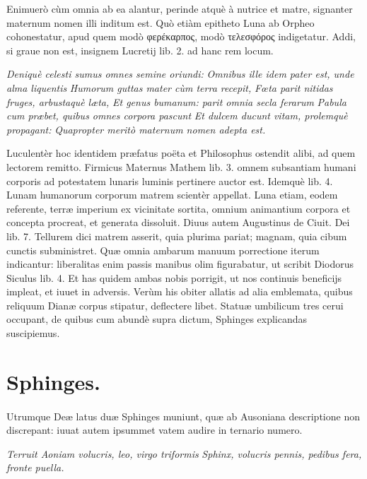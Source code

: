 \documentclass[a4paper, 11pt, oneside, polutonikogreek, latin]{article}
\begin{document}
Enimuerò cùm omnia ab ea alantur, perinde atquè à nutrice et matre, signanter maternum nomen illi inditum est. Quò etiàm epitheto Luna ab Orpheo cohonestatur, apud quem modò φερέκαρπος, modò τελεσφόρος indigetatur. Addi, si graue non est, insignem Lucretij lib. 2. ad hanc rem locum.

\emph{Deniquè celesti sumus omnes semine oriundi:}
\emph{Omnibus ille idem pater est, unde alma liquentis}
\emph{Humorum guttas mater cùm terra recepit,}
\emph{Fœta parit nitidas fruges, arbustaquè læta,}
\emph{Et genus bumanum: parit omnia secla ferarum}
\emph{Pabula cum præbet, quibus omnes corpora pascunt}
\emph{Et dulcem ducunt vitam, prolemquè propagant:}
\emph{Quapropter meritò maternum nomen adepta est.}

Luculentèr hoc identidem præfatus poëta et Philosophus ostendit alibi, ad quem lectorem remitto. Firmicus Maternus Mathem lib. 3. omnem subsantiam humani corporis ad potestatem lunaris luminis pertinere auctor est. Idemquè lib. 4. Lunam humanorum corporum matrem scientèr appellat. Luna etiam, eodem referente, terræ imperium ex vicinitate sortita, omnium animantium corpora et concepta procreat, et generata dissoluit. Diuus autem Augustinus de Ciuit. Dei lib. 7. Tellurem dici matrem asserit, quia plurima pariat; magnam, quia cibum cunctis subministret. Quæ omnia ambarum manuum porrectione iterum indicantur: liberalitas enim passis manibus olim figurabatur, ut scribit Diodorus Siculus lib. 4. Et has quidem ambas nobis porrigit, ut nos continuis beneficijs impleat, et iuuet in adversis. Verùm his obiter allatis ad alia emblemata, quibus reliquum Dianæ corpus stipatur, deflectere libet. Statuæ umbilicum tres cerui occupant, de quibus cum abundè supra dictum, Sphinges explicandas suscipiemus.
\clearpage
\section{Sphinges.}
\paragraph{}
Utrumque Deæ latus duæ Sphinges muniunt, quæ ab Ausoniana descriptione non discrepant: iuuat autem ipsummet vatem audire in ternario numero.

\emph{Terruit Aoniam volucris, leo, virgo triformis}
\emph{Sphinx, volucris pennis, pedibus fera, fronte puella.}
\end{document}
